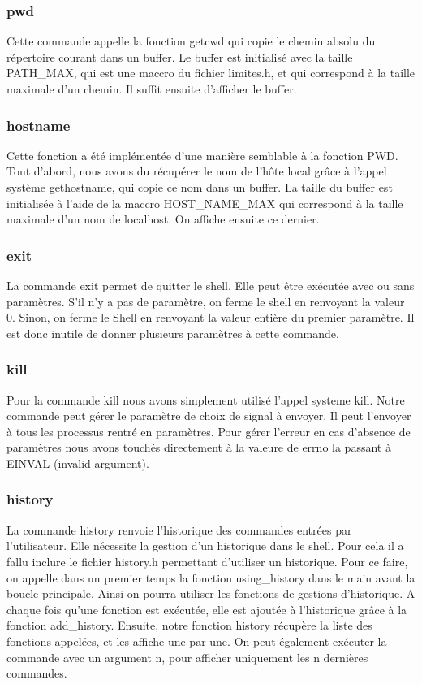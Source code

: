 \documentclass[12pt]{article}
\begin{document}
 \subsubsection{pwd}
 Cette commande appelle la fonction getcwd qui copie le chemin absolu du répertoire 
 courant dans un buffer.
 Le buffer est initialisé avec la taille PATH\_MAX, qui est une maccro du fichier limites.h,
 et qui correspond à la taille maximale d'un chemin. Il suffit ensuite d'afficher le buffer.
 
 \subsubsection{hostname}
 Cette fonction a été implémentée d'une manière semblable à la fonction PWD.
Tout d'abord, nous avons du récupérer le nom de l'hôte local grâce à l'appel système gethostname, qui copie ce nom dans un buffer. 
La taille du buffer est initialisée à l'aide de la maccro HOST\_NAME\_MAX qui correspond à la taille maximale d'un nom de localhost. 
On affiche ensuite ce dernier.
 
 \subsubsection{exit}
 La commande exit permet de quitter le shell. 
 Elle peut être exécutée avec ou sans paramètres. 
 S'il n'y a pas de paramètre, on ferme le shell en renvoyant la valeur 0. 
 Sinon, on ferme le Shell en renvoyant la valeur entière du premier paramètre. Il est donc inutile de donner plusieurs paramètres à cette commande.
 
 \subsubsection{kill}
 Pour la commande kill nous avons simplement utilisé l'appel systeme kill. 
 Notre commande peut gérer le paramètre de choix de signal à envoyer. Il peut l'envoyer à tous les processus
 rentré en paramètres.
 Pour gérer l'erreur en cas d'absence de paramètres nous avons touchés directement à la valeure
 de errno la passant à EINVAL (invalid argument).
 
 \subsubsection{history}
 La commande history renvoie l'historique des commandes entrées par l'utilisateur. 
 Elle nécessite la gestion d'un historique dans le shell. 
 Pour cela il a fallu inclure le fichier history.h permettant d'utiliser un historique. 
 Pour ce faire, on appelle dans un premier temps la fonction using\_history dans le main avant la boucle principale. Ainsi on pourra utiliser les fonctions de gestions d'historique. 
 A chaque fois qu'une fonction est exécutée, elle est ajoutée à l'historique grâce à la fonction add\_history. 
 Ensuite, notre fonction history récupère la liste des fonctions appelées, et les affiche une par une. 
 On peut également exécuter la commande avec un argument n, pour afficher uniquement les n dernières commandes.
 
\end{document}
